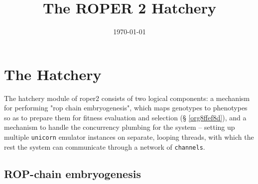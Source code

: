 \documentclass[11pt]{article}
\date{\today}
\title{The ROPER 2 Hatchery}
\begin{document}
\maketitle
\tableofcontents


\section{The Hatchery}
\label{sec:org256085f}

The hatchery module of \gls{roper2} consists of two logical components: a
mechanism for performing "\gls{rop} chain embryogenesis", which maps genotypes to
phenotypes so as to prepare them for fitness evaluation and selection (\S
\ref{org8ffef8d}), and a mechanism to handle the concurrency plumbing for the
system -- setting up multiple \texttt{unicorn} emulator instances on separate, looping
threads, with which the rest the system can communicate through a network of
\texttt{channels}. 

\subsection{ROP-chain embryogenesis}
\label{sec:orge1f120f}
\label{org8ffef8d}
\end{document}
